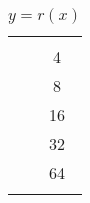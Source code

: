 \begin{problem}
\begin{subproblem}
\begin{table}[!htb]
		\hfill
		\begin{minipage}{0.25\textwidth}
			\centering
			\caption{$y=r(x)$}
			\begin{tabular}{S[table-format=1.0]S[table-format=2.0]}
				\beforeheading
				 &  \\
				             & 4             \\             & 8             \\             & 16            \\             & 32            \\             & 64            \\\lastline
			\end{tabular}
			\label{exp:tab:functionr}
		\end{minipage}
		\hfill
		\mbox{}
	\end{table}
\end{subproblem}



\end{problem}
